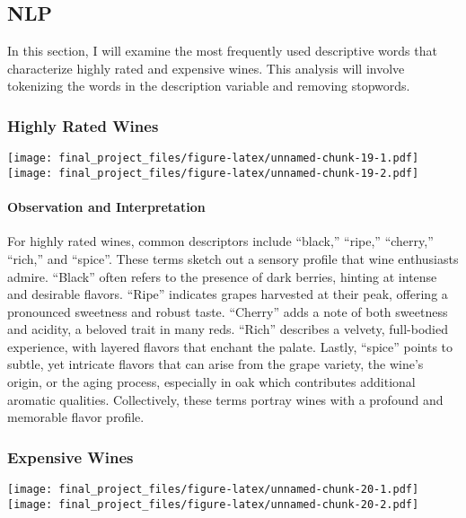 \documentclass[
]{article}
\begin{document}
\hypertarget{nlp}{%
\subsection{NLP}\label{nlp}}

In this section, I will examine the most frequently used descriptive
words that characterize highly rated and expensive wines. This analysis
will involve tokenizing the words in the description variable and
removing stopwords.

\hypertarget{highly-rated-wines}{%
\subsubsection{Highly Rated Wines}\label{highly-rated-wines}}

\texttt{[image: final\_project\_files/figure-latex/unnamed-chunk-19-1.pdf]}
\texttt{[image: final\_project\_files/figure-latex/unnamed-chunk-19-2.pdf]}

\hypertarget{observation-and-interpretation}{%
\paragraph{Observation and
Interpretation}\label{observation-and-interpretation}}

For highly rated wines, common descriptors include ``black,'' ``ripe,''
``cherry,'' ``rich,'' and ``spice''. These terms sketch out a sensory
profile that wine enthusiasts admire. ``Black'' often refers to the
presence of dark berries, hinting at intense and desirable flavors.
``Ripe'' indicates grapes harvested at their peak, offering a pronounced
sweetness and robust taste. ``Cherry'' adds a note of both sweetness and
acidity, a beloved trait in many reds. ``Rich'' describes a velvety,
full-bodied experience, with layered flavors that enchant the palate.
Lastly, ``spice'' points to subtle, yet intricate flavors that can arise
from the grape variety, the wine's origin, or the aging process,
especially in oak which contributes additional aromatic qualities.
Collectively, these terms portray wines with a profound and memorable
flavor profile.

\hypertarget{expensive-wines}{%
\subsubsection{Expensive Wines}\label{expensive-wines}}

\texttt{[image: final\_project\_files/figure-latex/unnamed-chunk-20-1.pdf]}
\texttt{[image: final\_project\_files/figure-latex/unnamed-chunk-20-2.pdf]}
\end{document}
